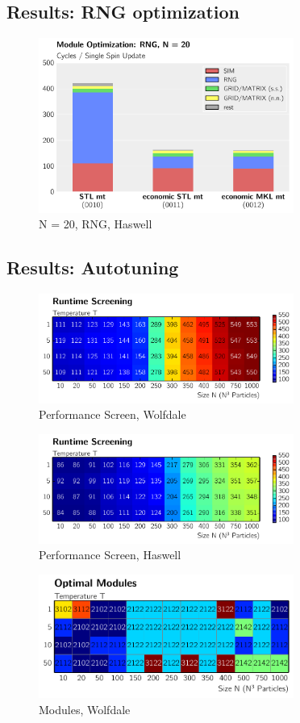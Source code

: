 \documentclass[letterpaper]{article}
\begin{document}
\subsection{Results: RNG optimization}
	\begin{figure}[h]\centering
	  \includegraphics[width = 8.36cm]{plots/dg_20_0.pdf}
	  \caption{N = 20, RNG, Haswell}
	\end{figure}
\subsection{Results: Autotuning}
	\begin{figure}[h]\centering
	  \includegraphics[width = 8.36cm]{plots/matrix_msk.pdf}
	  \caption{Performance Screen, Wolfdale}
	\end{figure}
	\begin{figure}[h]\centering
	  \includegraphics[width = 8.36cm]{plots/matrix_dg.pdf}
	  \caption{Performance Screen, Haswell}
	\end{figure}
	\begin{figure}[h]\centering
	  \includegraphics[width = 8.36cm]{plots/module_msk2.pdf}
	  \caption{Modules, Wolfdale}
	\end{figure}
	
\end{document}
